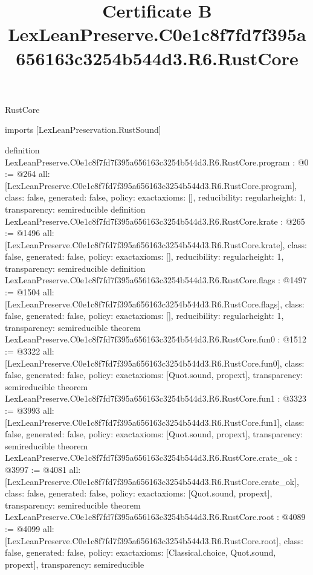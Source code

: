 \begin{lexlean}{RustCore}
\title{Certificate B LexLeanPreserve.C0e1c8f7fd7f395a656163c3254b544d3.R6.RustCore}
\begin{coremodule}
imports [LexLeanPreservation.RustSound]

definition LexLeanPreserve.C0e1c8f7fd7f395a656163c3254b544d3.R6.RustCore.program : @0 := @264 {
  all: [LexLeanPreserve.C0e1c8f7fd7f395a656163c3254b544d3.R6.RustCore.program],
  class: false,
  generated: false,
  policy: exact{axioms: []},
  reducibility: regular{height: 1},
  transparency: semireducible
}
definition LexLeanPreserve.C0e1c8f7fd7f395a656163c3254b544d3.R6.RustCore.krate : @265 := @1496 {
  all: [LexLeanPreserve.C0e1c8f7fd7f395a656163c3254b544d3.R6.RustCore.krate],
  class: false,
  generated: false,
  policy: exact{axioms: []},
  reducibility: regular{height: 1},
  transparency: semireducible
}
definition LexLeanPreserve.C0e1c8f7fd7f395a656163c3254b544d3.R6.RustCore.flags : @1497 := @1504 {
  all: [LexLeanPreserve.C0e1c8f7fd7f395a656163c3254b544d3.R6.RustCore.flags],
  class: false,
  generated: false,
  policy: exact{axioms: []},
  reducibility: regular{height: 1},
  transparency: semireducible
}
theorem LexLeanPreserve.C0e1c8f7fd7f395a656163c3254b544d3.R6.RustCore.fun0 : @1512 := @3322 {
  all: [LexLeanPreserve.C0e1c8f7fd7f395a656163c3254b544d3.R6.RustCore.fun0],
  class: false,
  generated: false,
  policy: exact{axioms: [Quot.sound, propext]},
  transparency: semireducible
}
theorem LexLeanPreserve.C0e1c8f7fd7f395a656163c3254b544d3.R6.RustCore.fun1 : @3323 := @3993 {
  all: [LexLeanPreserve.C0e1c8f7fd7f395a656163c3254b544d3.R6.RustCore.fun1],
  class: false,
  generated: false,
  policy: exact{axioms: [Quot.sound, propext]},
  transparency: semireducible
}
theorem LexLeanPreserve.C0e1c8f7fd7f395a656163c3254b544d3.R6.RustCore.crate_ok : @3997 := @4081 {
  all: [LexLeanPreserve.C0e1c8f7fd7f395a656163c3254b544d3.R6.RustCore.crate_ok],
  class: false,
  generated: false,
  policy: exact{axioms: [Quot.sound, propext]},
  transparency: semireducible
}
theorem LexLeanPreserve.C0e1c8f7fd7f395a656163c3254b544d3.R6.RustCore.root : @4089 := @4099 {
  all: [LexLeanPreserve.C0e1c8f7fd7f395a656163c3254b544d3.R6.RustCore.root],
  class: false,
  generated: false,
  policy: exact{axioms: [Classical.choice, Quot.sound, propext]},
  transparency: semireducible
}


\end{coremodule}
\end{lexlean}
